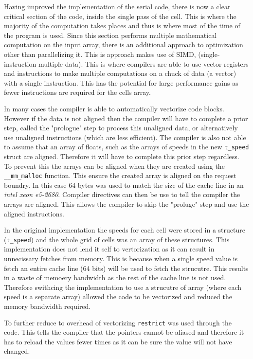 \documentclass{article}
\begin{document}
\begin{multicols}{2}
Having improved the implementation of the serial code, there is now a clear
critical section of the code, inside the single pass of the cell. This is where
the majority of the computation takes places and thus is where most of the time
of the program is used. Since this section performs multiple mathematical
computation on the input array, there is an additional approach to optimization
other than parallelizing it. This is approach makes use of SIMD,
(single-instruction multiple data). This is where compilers are able to use
vector registers and instructions to make multiple computations on a chuck of
data (a vector) with a single instruction. This has the potential for large
performance gains as fewer instructions are required for the cells array.

In many cases the compiler is able to automatically vectorize code blocks.
However if the data is not aligned then the compiler will have to complete a prior
step, called the "prologue" step to process this unaligned data, or
alternatively use unaligned instructions (which are less efficient). The
compiler is also not able to assume that an array of floats, such as the arrays
of speeds in the new \verb|t_speed| struct are aligned. Therefore it will have
to complete this prior step regardless. To prevent this the arrays can be
aligned when they are created using the \verb|__mm_malloc| function. This
ensure the created array is aligned on the request boundry. In this case 64
bytes was used to match the size of the cache line in an \emph{intel xeon
e5-2680}. Compiler directives can then be use to tell the compiler the arrays
are aligned. This allows the compiler to skip the "proluge" step and use the
aligned instructions.

In the original implementation the speeds for each cell were stored in a
structure (\verb|t_speed|) and the whole grid of cells was an array of these
structures. This implementation does not lend it self to vertorization as it
can result in unnecissary fetches from memory. This is because when a single
speed value is fetch an entire cache line (64 bits) will be used to fetch the
strucutre. This results in a waste of memoery bandwidth as the rest of the
cache line is not used. Therefore swithcing the implementation to use a
strucutre of array (where each speed is a separate array) allowed the code to
be vectorized and reduced the memory bandwidth required. 

To further reduce to overhead of vectorizing \verb|restrict| was used through
the code. This tells the compiler that the pointers cannot be aliased and
therefore it has to reload the values fewer times as it can be sure the value
will not have changed.


\end{multicols}
\end{document}
